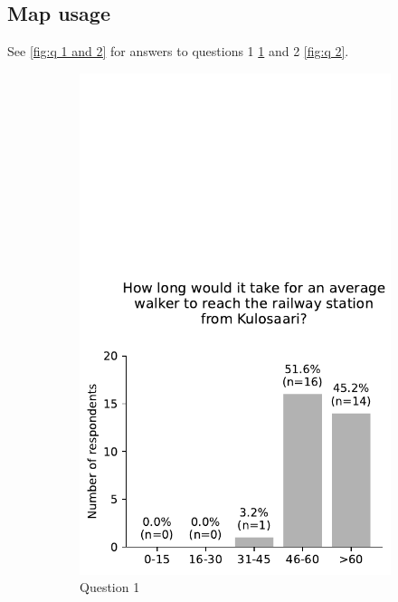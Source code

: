 \subsection{Map usage}

See \ref{fig:q 1 and 2} for answers to questions 1 \ref{fig:q 1} and 2 \ref{fig:q 2}.

\begin{figure}[H]
	\centering
	\begin{subfigure}[b]{0.5\textwidth}
		\centering
		\includegraphics[width=\textwidth]{visual/questionnaire/0.pdf}
		\caption{Question 1}
		\label{fig:q 1}
	\end{subfigure}%
	\hfill
	\begin{subfigure}[b]{0.5\textwidth}

\end{subfigure}
\end{figure}
